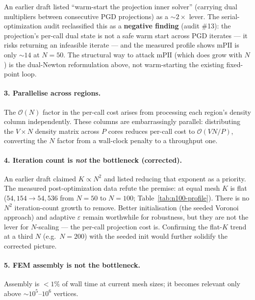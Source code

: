 \documentclass[11pt,a4paper]{article}
\begin{document}
\begin{remark}
An earlier draft listed ``warm-start the projection inner solver'' (carrying
dual multipliers between consecutive PGD projections) as a $\sim\!2\times$
lever.  The serial-optimization audit reclassified this as a \textbf{negative
finding} (audit \#13): the projection's per-call dual state is not a safe warm
start across PGD iterates --- it risks returning an infeasible iterate --- and
the measured profile shows $\mathrm{mPII}$ is only $\sim\!14$ at $N=50$.  The
structural way to attack $\mathrm{mPII}$ (which does grow with $N$) is the
dual-Newton reformulation above, not warm-starting the existing fixed-point
loop.
\end{remark}

\paragraph{3. Parallelise across regions.}
The $\mathcal{O}(N)$ factor in the per-call cost arises from processing each
region's density column independently.  These columns are embarrassingly
parallel: distributing the $V \times N$ density matrix across $P$ cores
reduces per-call cost to $\mathcal{O}(VN/P)$, converting the $N$ factor from
a wall-clock penalty to a throughput one.

\paragraph{4. Iteration count is \emph{not} the bottleneck (corrected).}
An earlier draft claimed $K\propto N^2$ and listed reducing that exponent as a
priority.  The measured post-optimization data refute the premise: at equal
mesh $K$ is flat ($54{,}154\to54{,}536$ from $N=50$ to $N=100$;
Table~\ref{tab:n100-profile}).  There is no $N^2$ iteration-count growth to
remove.  Better initialisation (the seeded Voronoi approach) and adaptive
$\varepsilon$ remain worthwhile for robustness, but they are not the lever for
$N$-scaling --- the per-call projection cost is.  Confirming the flat-$K$ trend
at a third $N$ (e.g.\ $N=200$) with the seeded init would further solidify the
corrected picture.

\paragraph{5. FEM assembly is not the bottleneck.}
Assembly is $<1\%$ of wall time at current mesh sizes; it becomes relevant only
above $\sim\!10^5$--$10^6$ vertices.
\end{document}
